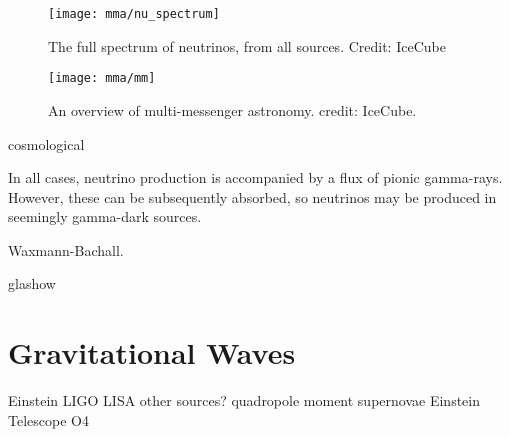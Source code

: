 \begin{figure}[!ht]
	\texttt{[image: mma/nu\_spectrum]}
	\caption{The full spectrum of neutrinos, from all sources. Credit: IceCube}
	\label{fig:nu_spectrum}
\end{figure}

\begin{figure}[!ht]
	\centering \texttt{[image: mma/mm]}
	\caption{An overview of multi-messenger astronomy. credit: IceCube.}
	\label{fig:mm}
\end{figure}

cosmological

In all cases, neutrino production is accompanied by a flux of pionic gamma-rays. However, these can be subsequently absorbed, so neutrinos may be produced in seemingly gamma-dark sources.

Waxmann-Bachall.

glashow

\section{Gravitational Waves}

Einstein
LIGO
LISA
other sources?
quadropole moment
supernovae
Einstein Telescope
O4